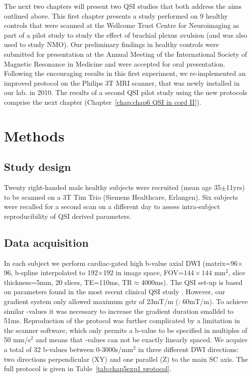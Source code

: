 The next two chapters will present two \gls{QSI} studies that both address the aims outlined above. This first chapter presents a study performed on 9 healthy controls that were scanned at the Wellcome Trust Centre for Neuroimaging as part of a pilot study to study the effect of brachial plexus avulsion (and was also used to study \gls{NMO}). Our preliminary findings in healthy controls were submitted for presentation at the Annual Meeting of the International Society of Magnetic Resonance in Medicine and were accepted for oral presentation. Following the encouraging results in this first experiment, we re-implemented an improved protocol on the Philips 3T MRI scanner, that was newly installed in our lab. in 2010. The results of a second \gls{QSI} pilot study using the new protocols comprise the next chapter (Chapter~\ref{chap:chap6 QSI in cord II}).

\section{Methods}
\label{sec:chapter 5 exp1 methods}
\subsection{Study design}
Twenty right-handed male healthy subjects were recruited (mean age 35$\pm$11yrs) to be scanned on a 3T Tim Trio (Siemens Healthcare, Erlangen). Six subjects were recalled for a second scan on a different day to assess intra-subject reproducibility of \gls{QSI} derived parameters.

\subsection{Data acquisition}
In each subject we perform cardiac-gated high b-value axial {\gls{DWI}} (matrix=96$\times$96, b-spline interpolated to 192$\times$192 in image space, FOV=$144\times144$ mm$^2$, slice thickness=5mm, 20 slices, TE=110ms, TR$\approx$4000ms). The \gls{QSI} set-up is based on parameters found in the most recent clinical \gls{QSI} study \citep{Farrell:2008}. However, our gradient system only allowed maximum \gls{gstr} of 23mT/m (\citet{Farrell:2008}: 60mT/m). To achieve similar {\q}-values it was necessary to increase the gradient duration \gls{smalldel} to 51ms. Reproduction of the protocol was further complicated by a limitation in the scanner software, which only permits a b-value to be specified in multiples of 50 mm/s$^2$ and means that {\q}-values can not be exactly linearly spaced. We acquire a total of 32 b-values between 0-3000s/mm$^2$ in three different {\gls{DWI}} directions: two directions perpendicular (XY) and one parallel (Z) to the main {\gls{SC}} axis. The full protocol is given in Table~\ref{tab:chap5exp1 protocol}.

